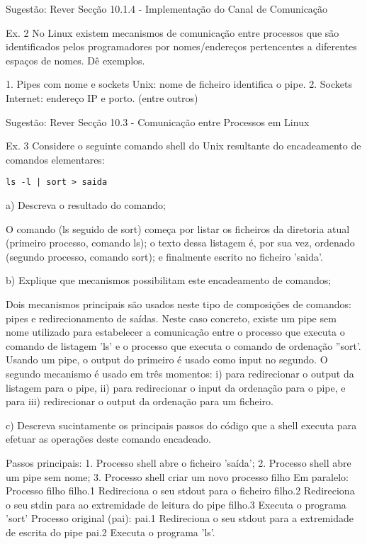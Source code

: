 \documentclass[11pt]{article}
\begin{document}
Sugestão: Rever Secção 10.1.4 - Implementação do Canal de Comunicação


Ex. 2 No Linux existem mecanismos de comunicação entre processos que são identificados pelos programadores por nomes/endereços pertencentes a diferentes espaços de nomes. Dê exemplos.

1. Pipes com nome e sockets Unix: nome de ficheiro identifica o pipe.
2. Sockets Internet: endereço IP e porto.
(entre outros)

Sugestão: Rever Secção 10.3 - Comunicação entre Processos em Linux


Ex. 3 Considere o seguinte comando shell do Unix resultante do encadeamento de comandos elementares:

\begin{lstlisting}[numbers=none]
    ls -l | sort > saida
\end{lstlisting}

a) Descreva o resultado do comando;

O comando (ls seguido de sort) começa por listar os ficheiros da diretoria atual (primeiro processo, comando ls); o texto dessa listagem é, por sua vez, ordenado (segundo processo, comando sort); e finalmente escrito no ficheiro 'saida'.

b) Explique que mecanismos possibilitam este encadeamento de comandos;

Dois mecanismos principais são usados neste tipo de composições de comandos: pipes e redirecionamento de saídas. Neste caso concreto, existe um pipe sem nome utilizado para estabelecer a comunicação entre o processo que executa o comando de listagem 'ls' e o processo que executa o comando de ordenação ''sort'. Usando um pipe, o output do primeiro é usado como input no segundo. O segundo mecanismo é usado em três momentos: i) para redirecionar o output da listagem para o pipe, ii) para redirecionar o input da ordenação para o pipe, e para iii) redirecionar o output da ordenação para um ficheiro.

c) Descreva sucintamente os principais passos do código que a shell executa para efetuar as operações deste comando encadeado.

Passos principais:
1. Processo shell abre o ficheiro 'saída';
2. Processo shell abre um pipe sem nome;
3. Processo shell criar um novo processo filho
Em paralelo:
Processo filho
filho.1 Redireciona o seu stdout para o ficheiro
filho.2 Redireciona o seu stdin para ao extremidade de leitura do pipe
filho.3 Executa o programa 'sort'
Processo original (pai):
pai.1 Redireciona o seu stdout para a extremidade de escrita do pipe
pai.2 Executa o programa 'ls'.
\end{document}
